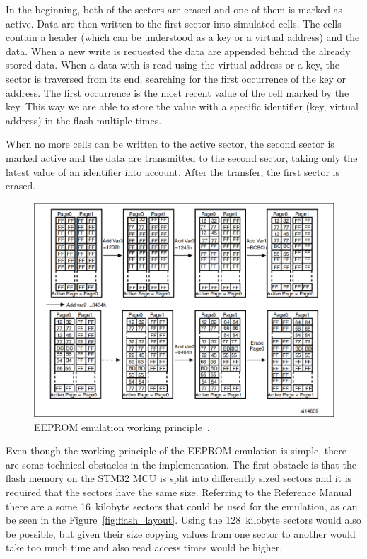 In the beginning, both of the sectors are erased and one of them is marked as active.
Data are then written to the first sector into simulated cells.
The cells contain a header (which can be understood as a key or a virtual address) and the data.
When a new write is requested the data are appended behind the already stored data.
When a data with is read using the virtual address or a key, the sector is traversed from its end, searching for the first occurrence of the key or address.
The first occurrence is the most recent value of the cell marked by the key.
This way we are able to store the value with a specific identifier (key, virtual address) in the flash multiple times.

When no more cells can be written to the active sector, the second sector is marked active and the data are transmitted to the second sector, taking only the latest value of an identifier into account.
After the transfer, the first sector is erased.

\begin{figure}[H]
    \centering
    \includegraphics[width=\textwidth]{obrazky/eeprom_emul_principle}
    \caption{EEPROM emulation working principle~\cite{stmicro_an3969_2011}.}
    \label{fig:eeprom_emul}
\end{figure}

Even though the working principle of the EEPROM emulation is simple, there are some technical obstacles in the implementation.
The first obstacle is that the flash memory on the STM32 MCU is split into differently sized sectors and it is required that the sectors have the same size.
Referring to the Reference Manual~\cite{stmicro_stm32f405rg_nodate} there are a some 16~kilobyte sectors that could be used for the emulation, as can be seen in the Figure~\ref{fig:flash_layout}.
Using the 128~kilobyte sectors would also be possible, but given their size copying values from one sector to another would take too much time and also read access times would be higher.

